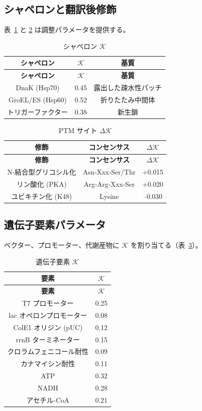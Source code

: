 \documentclass[12pt,a4paper]{ltjsarticle}
\newcommand{\REL}{\mathcal{K}}          %
\begin{document}
	\subsection{シャペロンと翻訳後修飾}
	表~\ref{tab:chaperones} と \ref{tab:ptm} は調整パラメータを提供する。
	
	\begin{longtable}{|c|c|c|}
		\caption{シャペロン \(\REL\)}\label{tab:chaperones}\\
		\hline
		\textbf{シャペロン} & \(\REL\) & \textbf{基質} \\
		\hline
		\endfirsthead
		\hline
		\textbf{シャペロン} & \(\REL\) & \textbf{基質} \\
		\hline
		\endhead
		\hline
		DnaK (Hsp70) & 0.45 & 露出した疎水性パッチ \\
		GroEL/ES (Hsp60) & 0.52 & 折りたたみ中間体 \\
		トリガーファクター & 0.38 & 新生鎖 \\
		\hline
	\end{longtable}
	
	\begin{longtable}{|c|c|c|}
		\caption{PTM サイト \(\Delta \REL\)}\label{tab:ptm}\\
		\hline
		\textbf{修飾} & \textbf{コンセンサス} & \(\Delta \REL\) \\
		\hline
		\endfirsthead
		\hline
		\textbf{修飾} & \textbf{コンセンサス} & \(\Delta \REL\) \\
		\hline
		\endhead
		\hline
		N-結合型グリコシル化 & Asn‑Xxx‑Ser/Thr & +0.015 \\
		リン酸化 (PKA) & Arg‑Arg‑Xxx‑Ser & +0.020 \\
		ユビキチン化 (K48) & Lysine & –0.030 \\
		\hline
	\end{longtable}
	
	\subsection{遺伝子要素パラメータ}
	ベクター、プロモーター、代謝産物に \(\REL\) を割り当てる（表~\ref{tab:elements}）。
	
	\begin{longtable}{|c|c|}
		\caption{遺伝子要素 \(\REL\)}\label{tab:elements}\\
		\hline
		\textbf{要素} & \(\REL\) \\
		\hline
		\endfirsthead
		\hline
		\textbf{要素} & \(\REL\) \\
		\hline
		\endhead
		\hline
		T7 プロモーター & 0.25 \\
		lac オペロンプロモーター & 0.08 \\
		ColE1 オリジン (pUC) & 0.12 \\
		rrnB ターミネーター & 0.15 \\
		クロラムフェニコール耐性 & 0.09 \\
		カナマイシン耐性 & 0.11 \\
		ATP & 0.32 \\
		NADH & 0.28 \\
		アセチル-CoA & 0.21 \\
		\hline
	\end{longtable}
	
\end{document}
